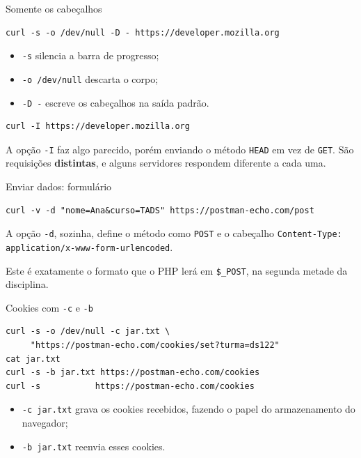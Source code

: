 \documentclass{beamer}
\begin{document}
\begin{frame}[fragile]{Somente os cabeçalhos}
  \begin{verbatim}
curl -s -o /dev/null -D - https://developer.mozilla.org
  \end{verbatim}

  \begin{itemize}
    \item \texttt{-s} silencia a barra de progresso;
    \item \texttt{-o /dev/null} descarta o corpo;
    \item \texttt{-D -} escreve os cabeçalhos na saída padrão.
  \end{itemize}

  \begin{verbatim}
curl -I https://developer.mozilla.org
  \end{verbatim}

  A opção \texttt{-I} faz algo parecido, porém enviando o método
  \texttt{HEAD} em vez de \texttt{GET}. São requisições \textbf{distintas}, e
  alguns servidores respondem diferente a cada uma.
\end{frame}

\begin{frame}[fragile]{Enviar dados: formulário}
  \begin{verbatim}
curl -v -d "nome=Ana&curso=TADS" https://postman-echo.com/post
  \end{verbatim}

  A opção \texttt{-d}, sozinha, define o método como \texttt{POST} e o
  cabeçalho \texttt{Content-Type: application/x-www-form-urlencoded}.

  \vspace{0.4cm}
  \begin{block}{}
    Este é exatamente o formato que o PHP lerá em \texttt{\$\_POST}, na segunda
    metade da disciplina.
  \end{block}
\end{frame}

\begin{frame}[fragile]{Cookies com \texttt{-c} e \texttt{-b}}
  \begin{verbatim}
curl -s -o /dev/null -c jar.txt \
     "https://postman-echo.com/cookies/set?turma=ds122"
cat jar.txt
curl -s -b jar.txt https://postman-echo.com/cookies
curl -s           https://postman-echo.com/cookies
  \end{verbatim}

  \begin{itemize}
    \item \texttt{-c jar.txt} grava os cookies recebidos, fazendo o papel do
          armazenamento do navegador;
    \item \texttt{-b jar.txt} reenvia esses cookies.
  \end{itemize}
\end{frame}
\end{document}
